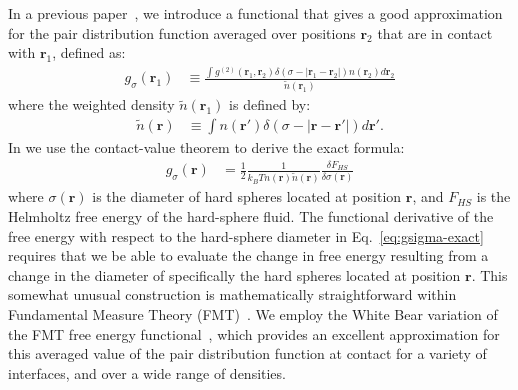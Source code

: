 \documentclass[letterpaper,twocolumn,amsmath,amssymb,pre,aps,10pt]{revtex4-1}
\newcommand{\cyan}[1]{{\bf \color{cyan} #1}}
\newcommand{\rr}{\textbf{r}}
\newcommand{\jeffsays}[1]{{\color{red} [\cyan{Jeff:} \emph{#1}]}}
\begin{document}
In a previous paper~\cite{schulte2012using}, we introduce a
functional that gives a good approximation for the pair distribution
function averaged over positions $\rr_2$ that are in contact with
$\rr_1$, defined as:
\begin{align}
  g_\sigma(\rr_1) &\equiv \frac{ \int g^{(2)}(\rr_1,\rr_2) \delta(\sigma -|\rr_1-\rr_2|)n(\rr_2)
    d\rr_2 }{ \tilde{n}(\rr_1)  }
\end{align}
where the weighted density $\tilde{n}(\rr_1)$ is defined by:
\begin{align}
  \tilde{n}(\rr) &\equiv \int n(\rr') \delta(\sigma -|\rr - \rr'|)d\rr'.
\end{align}
In \cite{schulte2012using} we use the contact-value theorem to derive the exact formula:
\begin{align}
  g_\sigma(\rr)%
  &= \frac12 \frac{1}{k_BT n(\rr) \tilde{n}(\rr)} \frac{\delta
    F_{HS}}{\delta \sigma(\mathbf{r})} \label{eq:gsigma-exact}
\end{align}
where $\sigma(\rr)$ is the diameter of hard spheres located at
position $\rr$, and $F_{HS}$ is the Helmholtz free energy of the
hard-sphere fluid.  The functional derivative of the free energy with
respect to the hard-sphere diameter in Eq.~\ref{eq:gsigma-exact} requires
that we be able to evaluate the change in free energy resulting from a
change in the diameter of specifically the hard spheres located at
position $\rr$.  This somewhat unusual construction is mathematically
straightforward within Fundamental Measure Theory
(FMT)~\cite{rosenfeld1989free}.  We employ the White Bear variation of
the FMT free energy functional~\cite{roth2002whitebear}, which
provides an excellent approximation for this averaged value of the
pair distribution function at contact for a variety of interfaces, and
over a wide range of densities.


\end{document}
